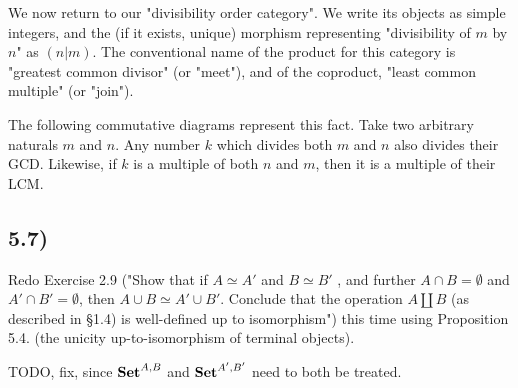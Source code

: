 \documentclass[12pt, letterpaper, twoside]{report}
\begin{document}
We now return to our "divisibility order category". We write its objects as simple integers, and the (if it exists, unique) morphism representing "divisibility of $m$ by $n$" as $(n | m)$. The conventional name of the product for this category is "greatest common divisor" (or "meet"), and of the coproduct, "least common multiple" (or "join").

The following commutative diagrams represent this fact. Take two arbitrary naturals $m$ and $n$. Any number $k$ which divides both $m$ and $n$ also divides their GCD. Likewise, if $k$ is a multiple of both $n$ and $m$, then it is a multiple of their LCM. 





\subsection*{5.7)}

Redo Exercise 2.9 ("Show that if $A \simeq A'$ and $B \simeq B'$ , and further $A \cap B = \emptyset$ and $A' \cap B' = \emptyset$, then $A \cup B \simeq A' \cup B'$. Conclude that the operation $A \coprod B$ (as described in §1.4) is well-defined up to isomorphism") this time using Proposition 5.4. (the unicity up-to-isomorphism of terminal objects).

TODO, fix, since $\text{\textbf{Set}}^{A,B}$ and $\text{\textbf{Set}}^{A',B'}$ need to both be treated.
\end{document}
